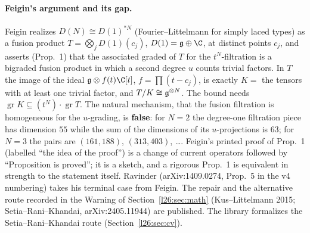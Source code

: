 \paragraph{Feigin's argument and its gap.} Feigin realizes $D(N)\cong D(1)^{*N}$ (Fourier--Littelmann for simply laced types) as a fusion product
$T=\bigotimes_jD(1)(c_j)$, $D(1)=\ltwentysixg\oplus\C$, at distinct points $c_j$, and asserts (Prop.~1) that the associated
graded of $T$ for the $t^N$-filtration is a bigraded fusion product in which a second degree $u$ counts trivial factors.
In $T$ the image of the ideal $\ltwentysixg\otimes f(t)\C[t]$, $f=\prod(t-c_j)$, is exactly $K=$ the tensors with at least one
trivial factor, and $T/K\cong\mathfrak g^{\otimes N}$. The bound needs $\operatorname{gr}K\subseteq(t^N)\cdot\operatorname{gr}T$. The
natural mechanism, that the fusion filtration is homogeneous for the $u$-grading, is \textbf{false}: for $N=2$ the degree-one
filtration piece has dimension $55$ while the sum of the dimensions of its $u$-projections is $63$; for $N=3$ the pairs are
$(161,188)$, $(313,403)$, \dots. Feigin's printed proof of Prop.~1 (labelled ``the idea of the proof'') is a change of current
operators followed by ``Proposition is proved''; it is a sketch, and a rigorous Prop.~1 is equivalent in strength to the statement itself.
Ravinder (arXiv:1409.0274, Prop.~5 in the v4 numbering) takes his terminal case from Feigin. The repair and the alternative route recorded in
the Warning of Section~\ref{l26:sec:math} (Kus--Littelmann 2015; Setia--Rani--Khandai, arXiv:2405.11944) are published. The library formalizes the Setia--Rani--Khandai route (Section~\ref{l26:sec:cv}).

